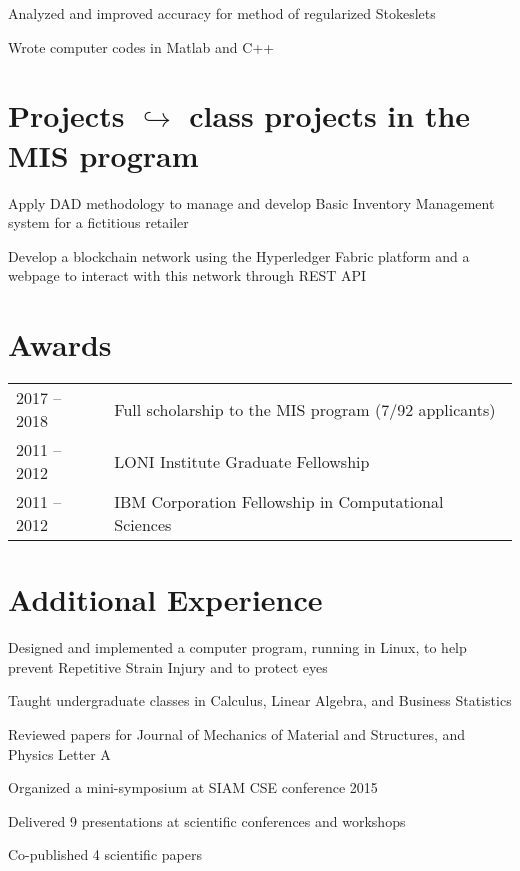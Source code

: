 \documentclass[]{deedy-resume-openfont}
\def\mysep{$\hookrightarrow$ }
\begin{document}
\begin{minipage}[t]{0.63\textwidth}
\descript{\mysep Postdoc}
\begin{tightemize}
  \item Analyzed and improved accuracy for method of regularized Stokeslets
  \item Wrote computer codes in Matlab and C++
\end{tightemize}

\section{Projects \small \mysep class projects in the MIS program}
\vspace{\topsep}
\begin{tightemize}
\item Apply DAD methodology to manage and develop Basic Inventory Management
  system for a fictitious retailer
\item Develop a blockchain network using the Hyperledger Fabric
  platform and a webpage to interact with this network through REST API
\end{tightemize}

\section{Awards}
\begin{tabular}[h]{ll}
  2017 -- 2018 & Full scholarship to the MIS program (7/92 applicants)\\
  2011 -- 2012 & LONI Institute Graduate Fellowship\\
  2011 -- 2012 & IBM Corporation Fellowship in Computational Sciences
\end{tabular}
\sectionsep

\section{Additional Experience}
\vspace{\topsep}
\begin{tightemize}
\item Designed and implemented a computer program, running in Linux, to
  help prevent Repetitive Strain Injury and to protect eyes
\item Taught undergraduate classes in Calculus, Linear Algebra, and Business Statistics
\item Reviewed papers for Journal of Mechanics of Material and Structures, and Physics Letter A
\item Organized a mini-symposium at SIAM CSE 
  conference 2015
\item Delivered 9 presentations at scientific conferences and workshops
\item Co-published 4 scientific papers
\end{tightemize}

\end{minipage}
\end{document}
